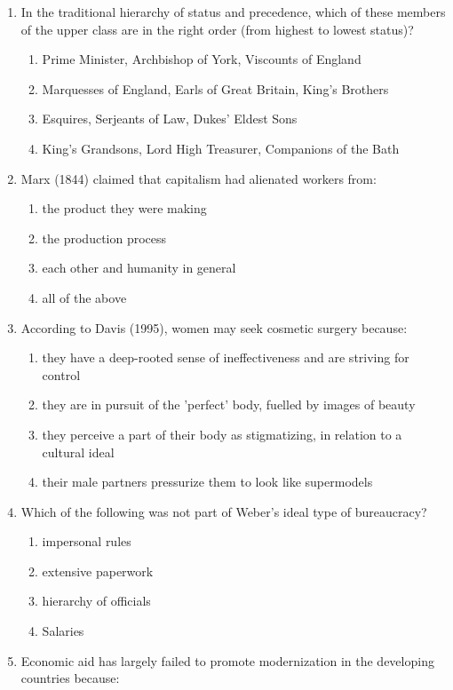 \documentclass[12pt]{article}
\begin{document}
\begin{enumerate}[label=\arabic*.]
\item In the traditional hierarchy of status and precedence, which of these members of the upper class are in the right order (from highest to lowest status)?
\begin{enumerate}[label=(\alph*)]
    \item Prime Minister, Archbishop of York, Viscounts of England
    \item Marquesses of England, Earls of Great Britain, King's Brothers
    \item Esquires, Serjeants of Law, Dukes' Eldest Sons
    \item King's Grandsons, Lord High Treasurer, Companions of the Bath
\end{enumerate}
\item Marx (1844) claimed that capitalism had alienated workers from:
\begin{enumerate}[label=(\alph*)]
    \item the product they were making
    \item the production process
    \item each other and humanity in general
    \item all of the above
\end{enumerate}
\item According to Davis (1995), women may seek cosmetic surgery because:
\begin{enumerate}[label=(\alph*)]
    \item they have a deep-rooted sense of ineffectiveness and are striving for control
    \item they are in pursuit of the 'perfect' body, fuelled by images of beauty
    \item they perceive a part of their body as stigmatizing, in relation to a cultural ideal
    \item their male partners pressurize them to look like supermodels
\end{enumerate}
\item Which of the following was not part of Weber's ideal type of bureaucracy?
\begin{enumerate}[label=(\alph*)]
    \item impersonal rules
    \item extensive paperwork
    \item hierarchy of officials
    \item Salaries
\end{enumerate}
\item Economic aid has largely failed to promote modernization in the developing countries because:

\end{enumerate}
\end{document}
